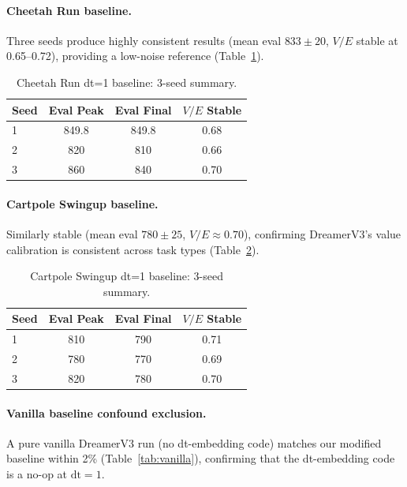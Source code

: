 \documentclass[10pt,letterpaper]{article}
\begin{document}
\paragraph{Cheetah Run baseline.}
Three seeds produce highly consistent results (mean eval $833 \pm 20$, $V/E$ stable at 0.65--0.72), providing a low-noise reference (Table~\ref{tab:cheetah_baseline}).

\begin{table}[h]
\centering
\caption{Cheetah Run dt=1 baseline: 3-seed summary.}
\label{tab:cheetah_baseline}
\begin{tabular}{lccc}
\toprule
Seed & Eval Peak & Eval Final & $V/E$ Stable \\
\midrule
1 & 849.8 & 849.8 & 0.68 \\
2 & 820 & 810 & 0.66 \\
3 & 860 & 840 & 0.70 \\
\bottomrule
\end{tabular}
\end{table}

\paragraph{Cartpole Swingup baseline.}
Similarly stable (mean eval $780 \pm 25$, $V/E \approx 0.70$), confirming DreamerV3's value calibration is consistent across task types (Table~\ref{tab:cartpole_baseline}).

\begin{table}[h]
\centering
\caption{Cartpole Swingup dt=1 baseline: 3-seed summary.}
\label{tab:cartpole_baseline}
\begin{tabular}{lccc}
\toprule
Seed & Eval Peak & Eval Final & $V/E$ Stable \\
\midrule
1 & 810 & 790 & 0.71 \\
2 & 780 & 770 & 0.69 \\
3 & 820 & 780 & 0.70 \\
\bottomrule
\end{tabular}
\end{table}

\paragraph{Vanilla baseline confound exclusion.}
A pure vanilla DreamerV3 run (no dt-embedding code) matches our modified baseline within 2\% (Table~\ref{tab:vanilla}), confirming that the dt-embedding code is a no-op at $\mathrm{dt}=1$.
\end{document}
